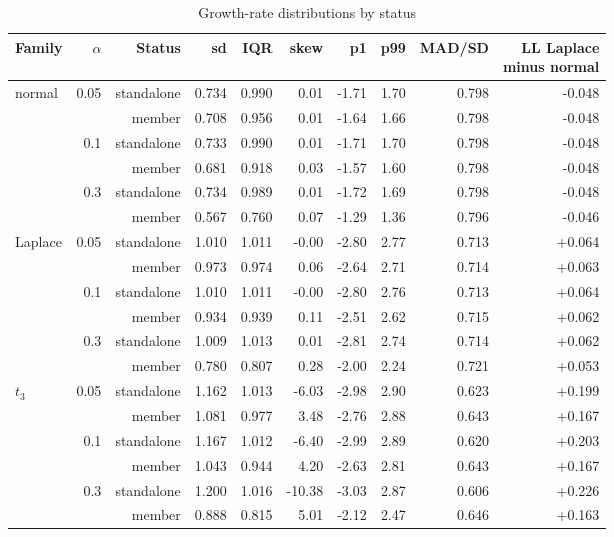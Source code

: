 \begin{table}
\centering
\caption{Growth-rate distributions by status}
\label{tab:a16_growth_status}
\small
\begin{tabular}{lrrrrrrrrr}
\toprule
Family & $\alpha$ & Status & sd & IQR & skew & p1 & p99 & MAD/SD & \makecell[b]{LL Laplace\\{}minus normal} \\
\midrule
normal & 0.05 & standalone & 0.734 & 0.990 & 0.01 & -1.71 & 1.70 & 0.798 & -0.048 \\
 &  & member & 0.708 & 0.956 & 0.01 & -1.64 & 1.66 & 0.798 & -0.048 \\
 & 0.1 & standalone & 0.733 & 0.990 & 0.01 & -1.71 & 1.70 & 0.798 & -0.048 \\
 &  & member & 0.681 & 0.918 & 0.03 & -1.57 & 1.60 & 0.798 & -0.048 \\
 & 0.3 & standalone & 0.734 & 0.989 & 0.01 & -1.72 & 1.69 & 0.798 & -0.048 \\
 &  & member & 0.567 & 0.760 & 0.07 & -1.29 & 1.36 & 0.796 & -0.046 \\
Laplace & 0.05 & standalone & 1.010 & 1.011 & -0.00 & -2.80 & 2.77 & 0.713 & +0.064 \\
 &  & member & 0.973 & 0.974 & 0.06 & -2.64 & 2.71 & 0.714 & +0.063 \\
 & 0.1 & standalone & 1.010 & 1.011 & -0.00 & -2.80 & 2.76 & 0.713 & +0.064 \\
 &  & member & 0.934 & 0.939 & 0.11 & -2.51 & 2.62 & 0.715 & +0.062 \\
 & 0.3 & standalone & 1.009 & 1.013 & 0.01 & -2.81 & 2.74 & 0.714 & +0.062 \\
 &  & member & 0.780 & 0.807 & 0.28 & -2.00 & 2.24 & 0.721 & +0.053 \\
$t_3$ & 0.05 & standalone & 1.162 & 1.013 & -6.03 & -2.98 & 2.90 & 0.623 & +0.199 \\
 &  & member & 1.081 & 0.977 & 3.48 & -2.76 & 2.88 & 0.643 & +0.167 \\
 & 0.1 & standalone & 1.167 & 1.012 & -6.40 & -2.99 & 2.89 & 0.620 & +0.203 \\
 &  & member & 1.043 & 0.944 & 4.20 & -2.63 & 2.81 & 0.643 & +0.167 \\
 & 0.3 & standalone & 1.200 & 1.016 & -10.38 & -3.03 & 2.87 & 0.606 & +0.226 \\
 &  & member & 0.888 & 0.815 & 5.01 & -2.12 & 2.47 & 0.646 & +0.163 \\
\bottomrule
\end{tabular}
\end{table}
